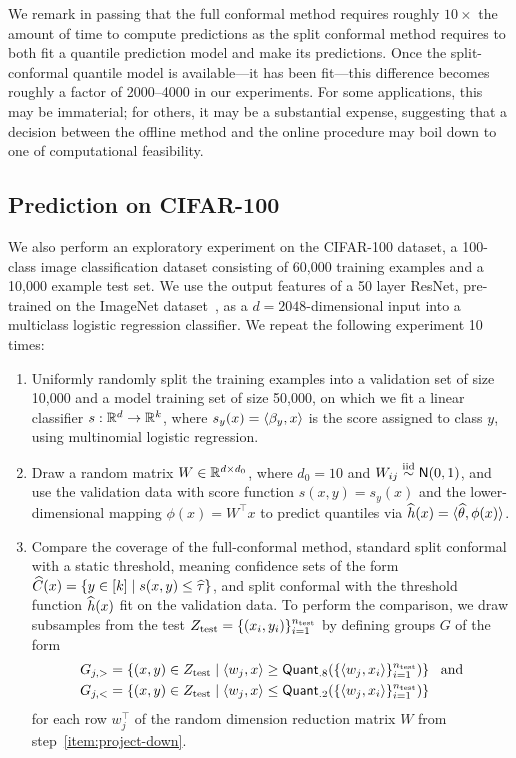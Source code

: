 \documentclass[11pt]{article}
\newcommand{\scorefunc}{s}
\newcommand{\quant}{\mathsf{Quant}}
\begin{document}
We remark in passing that the full conformal method requires roughly $10
\times$ the amount of time to compute predictions as the split conformal
method requires to both fit a quantile prediction model and make its
predictions.
%
Once the split-conformal quantile model is available---it has been
fit---this difference becomes roughly a factor
of 2000--4000 in our experiments.
%
For some applications, this may be immaterial; for others, it may be
a substantial expense, suggesting that a decision between
the offline method and the online procedure may boil down to
one of computational feasibility.

\subsection{Prediction on CIFAR-100}

We also perform an exploratory experiment on the CIFAR-100 dataset, a
100-class image classification dataset consisting of 60,000 training
examples and a 10,000 example test set.
%
We use the output features of a 50 layer ResNet, pre-trained
on the ImageNet dataset~\cite{HeZhReSu16, HeZhReSu16b},
as a $d = 2048$-dimensional input into a multiclass
logistic regression classifier.
%
We repeat the following experiment 10 times:
\begin{enumerate}[1.]
\item Uniformly randomly split the training examples into a validation set
  of size 10,000 and a model training set of size 50,000, on which we fit a
  linear classifier $\scorefunc : \R^d \to \R^k$, where $\scorefunc_y(x) =
  \<\beta_y, x\>$ is the score assigned to class $y$, using multinomial
  logistic regression.
\item \label{item:project-down}
  Draw a random matrix $W \in \mathbb{R}^{d \times d_0}$, where
  $d_0 = 10$ and $W_{ij} \stackrel{\rm iid}{\sim} \mathsf{N}(0, 1)$,
  and use the validation data with score function
  $\scorefunc(x, y) = \scorefunc_y(x)$ and the lower-dimensional
  mapping $\phi(x) = W^\top x$
  to predict quantiles via $\widehat{h}(x) = \langle\widehat{\theta}, \phi(x)\rangle$.
\item Compare the coverage of the full-conformal method,
  standard split conformal with a static threshold,
  meaning confidence sets of the form
  $\what{C}(x) = \{y \in [k] \mid \scorefunc(x, y) \le \what{\tau}\}$,
  and split conformal with the threshold function
  $\widehat{h}(x)$ fit on the validation data.
  To perform the comparison, we draw subsamples from the test
  $Z_{\textup{test}} = \{(x_i, y_i)\}_{i = 1}^{n_{\textup{test}}}$
  by defining groups $G$ of the form
  \begin{align*}
    G_{j,>} & = \left\{(x, y) \in Z_{\textup{test}}
    \mid  \<w_j, x\> \ge \quant_{.8}(\{\<w_j, x_i\>\}_{i = 1}^{n_{\textup{test}}})
    \right\} ~~ \mbox{and} \\
    G_{j,<} & = \left\{(x, y) \in Z_{\textup{test}}
    \mid  \<w_j, x\> \le \quant_{.2}(\{\<w_j, x_i\>\}_{i = 1}^{n_{\textup{test}}})
    \right\}
  \end{align*}
  for each row $w_j^\top$ of the random dimension reduction matrix
  $W$ from step~\ref{item:project-down}.
\end{enumerate}
\end{document}
